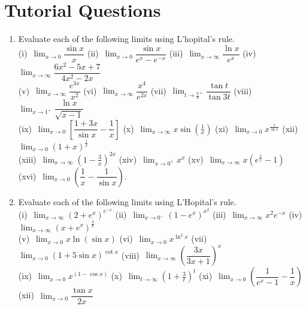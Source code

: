 \documentclass[titlepage,a4paper,12pt]{report}
\begin{document}
\section{Tutorial Questions}
\begin{enumerate}
\item Evaluate each of the following limits using L'hopital's rule.\\
(i)\, $\displaystyle \lim _{x\rightarrow 0}\dfrac{\sin x}{x}$ \quad (ii)\, $\displaystyle \lim _{x\rightarrow 0}\dfrac{\sin x}{e^x-e^{-x}}$ \quad (iii)\, $\displaystyle \lim _{x\rightarrow \infty}\dfrac{\ln x}{e^x}$ \quad (iv)\, $\displaystyle \lim _{x\rightarrow \infty}\dfrac{6x^2-5x+7}{4x^2-2x}$\\
(v)\, $\displaystyle \lim _{x\rightarrow \infty}\dfrac{e^{3x}}{x^2}$ \quad (vi)\, $\displaystyle \lim _{x\rightarrow \infty}\dfrac{x^4}{e^{2x}}$ \quad (vii)\, $\displaystyle \lim _{t\rightarrow {\frac{\pi}{4}}^+}\dfrac{\tan t}{\tan 3t}$ \quad (viii)\, $\displaystyle \lim _{x\rightarrow {1}^+}\dfrac{\ln x}{\sqrt{x-1}}$\\
(ix)\, $\displaystyle \lim _{x\rightarrow 0}\left[\dfrac{1+3x}{\sin x}-\dfrac{1}{x}\right]$ \quad (x)\, $\displaystyle \lim _{x\rightarrow \infty}x\sin \left(\frac{1}{x}\right)$ \quad (xi)\, $\displaystyle \lim _{x\rightarrow 0} x^{\frac{1}{\ln x}}$ \quad (xii)\, $\displaystyle \lim _{x\rightarrow 0}(1+x)^{\frac{1}{x}}$\\
(xiii)\, $\displaystyle \lim _{x\rightarrow \infty}\left(1-\frac{3}{x}\right)^{2x}$ \quad (xiv)\, $\displaystyle \lim _{x\rightarrow 0^+}x^x$ \quad (xv)\, $\displaystyle \lim _{x\rightarrow \infty}x(e^{\frac{1}{x}}-1)$ \quad (xvi)\, $\displaystyle \lim _{x\rightarrow 0}\left(\dfrac{1}{x}-\dfrac{1}{\sin x}\right)$.
\item Evaluate each of the following limits using L'Hopital's rule.\\
(i)\, $\displaystyle \lim _{x\rightarrow \infty}(2+e^x)^{e^{-x}}$ \quad (ii)\, $\displaystyle \lim _{x\rightarrow 0^-}(1-e^x)^{x^2}$ \quad (iii)\, $\displaystyle \lim _{x\rightarrow \infty}x^2e^{-x}$ \quad (iv)\, $\displaystyle \lim _{x\rightarrow \infty} (x+e^x)^{\frac{2}{x}}$\\
(v)\, $\displaystyle \lim _{x\rightarrow 0}x\ln (\sin x)$ \quad (vi)\, $\displaystyle \lim _{x\rightarrow 0}x^{\ln ^2 x}$ \quad (vii)\, $\displaystyle \lim _{x\rightarrow 0}(1+5\sin x)^{\cot x}$ \quad (viii)\, $\displaystyle \lim _{x\rightarrow \infty}\left(\dfrac{3x}{3x+1}\right)^x$\\
(ix)\, $\displaystyle \lim _{x\rightarrow 0}x^{(1-\cos x)}$ \quad (x)\, $\displaystyle \lim _{t\rightarrow \infty}\left(1+\frac{3}{t}\right)^t$ \quad (xi)\, $\displaystyle \lim _{x\rightarrow 0}\left(\dfrac{1}{e^x-1}-\dfrac{1}{x}\right)$ \quad (xii)\, $\displaystyle \lim _{x\rightarrow 0}\dfrac{\tan x}{2x}$\\

\end{enumerate}
\end{document}
